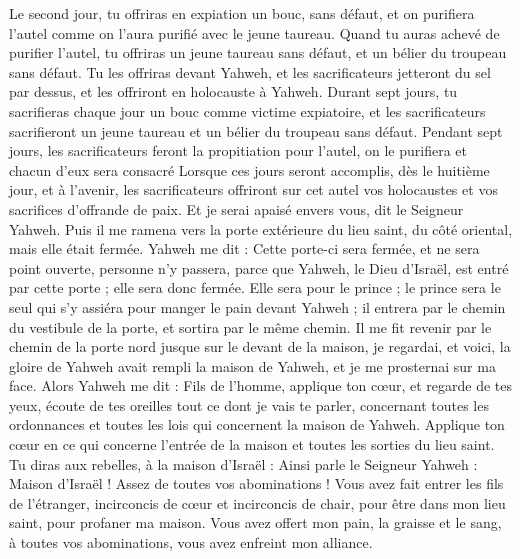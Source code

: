\begin{multicols}{2}
Le second jour, tu offriras en expiation un bouc, sans défaut, et on purifiera l'autel comme on l'aura purifié avec le jeune taureau.
Quand tu auras achevé de purifier l'autel, tu offriras un jeune taureau sans défaut, et un bélier du troupeau sans défaut.
Tu les offriras devant Yahweh, et les sacrificateurs jetteront du sel par dessus, et les offriront en holocauste à Yahweh.
Durant sept jours, tu sacrifieras chaque jour un bouc comme victime expiatoire, et les sacrificateurs sacrifieront un jeune taureau et un bélier du troupeau sans défaut.
Pendant sept jours, les sacrificateurs feront la propitiation pour l'autel, on le purifiera et chacun d'eux sera consacré
Lorsque ces jours seront accomplis, dès le huitième jour, et à l'avenir, les sacrificateurs offriront sur cet autel vos holocaustes et vos sacrifices d'offrande de paix. Et je serai apaisé envers vous, dit le Seigneur Yahweh.
\VerseOne{}Puis il me ramena vers la porte extérieure du lieu saint, du côté oriental, mais elle était fermée.
Yahweh me dit : Cette porte-ci sera fermée, et ne sera point ouverte, personne n'y passera, parce que Yahweh, le Dieu d'Israël, est entré par cette porte ; elle sera donc fermée.
Elle sera pour le prince ; le prince sera le seul qui s'y assiéra pour manger le pain devant Yahweh ; il entrera par le chemin du vestibule de la porte, et sortira par le même chemin.
Il me fit revenir par le chemin de la porte nord jusque sur le devant de la maison, je regardai, et voici, la gloire de Yahweh avait rempli la maison de Yahweh, et je me prosternai sur ma face.
Alors Yahweh me dit : Fils de l'homme, applique ton cœur, et regarde de tes yeux, écoute de tes oreilles tout ce dont je vais te parler, concernant toutes les ordonnances et toutes les lois qui concernent la maison de Yahweh. Applique ton cœur en ce qui concerne l'entrée de la maison et toutes les sorties du lieu saint.
Tu diras aux rebelles, à la maison d'Israël : Ainsi parle le Seigneur Yahweh : Maison d'Israël ! Assez de toutes vos abominations !
Vous avez fait entrer les fils de l'étranger, incirconcis de cœur et incirconcis de chair, pour être dans mon lieu saint, pour profaner ma maison. Vous avez offert mon pain, la graisse et le sang, à toutes vos abominations, vous avez enfreint mon alliance.

\end{multicols}
